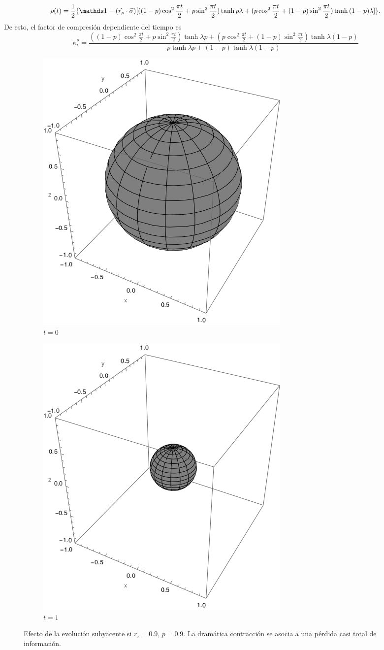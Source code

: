 \begin{equation}
  \rho(t)=\frac{1}{2}\{\Id-(\hat{r_{\rho}}\cdot\vec{\sigma})[((1-p)\cos^{2}{\frac{\pi t}{2}}+p\sin^{2}{\frac{\pi t}{2}})\tanh{p\lambda}+(p\cos^{2}{\frac{\pi t}{2}}+(1-p)\sin^{2}{\frac{\pi t}{2}})\tanh{(1-p)\lambda}]\}.
\end{equation}
De esto, el factor de compresión dependiente del tiempo es
\begin{equation}\label{eq:SWAPFactort}
  \kappa_{t}^{\rho}=\frac{((1-p)\cos^{2}{\frac{\pi t}{2}}+p\sin^{2}{\frac{\pi t}{2}})\tanh{\lambda p}+(p\cos^{2}{\frac{\pi t}{2}}+(1-p)\sin^{2}{\frac{\pi t}{2}})\tanh{\lambda (1-p)}}{
    p\tanh{\lambda p}+(1-p)\tanh{\lambda (1-p)}}
\end{equation}

\begin{figure}[h!]
  \centering
  \begin{subfigure}{0.475\textwidth}
    \centering
    \includegraphics[width=0.6\linewidth]{chapter3/figures/sphere_swapcontraction_t=0_z=0.9_p=0.9.png}
    \caption{$t=0$}
  \end{subfigure}%
  \begin{subfigure}{0.475\textwidth}
    \centering
    \includegraphics[width=0.6\linewidth]{chapter3/figures/sphere_swapcontraction_t=1_z=0.9_p=0.9.png}
    \caption{$t=1$}
  \end{subfigure}
  \caption{Efecto de la evolución subyacente si $r_{z}=0.9$, $p=0.9$. La dramática contracción se asocia a una pérdida casi total de información.}
  \label{fig:SWAPFactorSequence}
  \end{figure}
